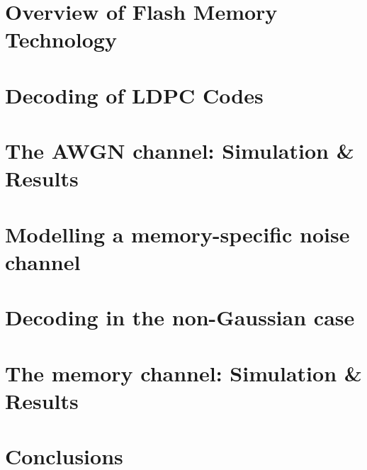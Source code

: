 \documentclass[11pt]{article}
\begin{document}
\section{Overview of Flash Memory Technology} 

\section{Decoding of LDPC Codes}

\section{The AWGN channel: Simulation \& Results}

\section{Modelling a memory-specific noise channel}

\section{Decoding in the non-Gaussian case}

\section{The memory channel: Simulation \& Results}

\section{Conclusions}
\end{document}
